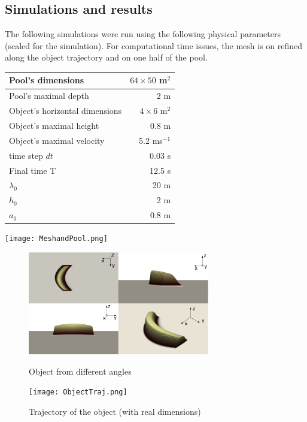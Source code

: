 \documentclass[11pt,a4paper]{article}
\begin{document}
\subsection{Simulations and results}\label{Results}
	The following simulations were run using the following physical parameters (scaled for the simulation). For computational time issues, the mesh is on refined along the object trajectory and on one half of the pool.\\
	\begin{minipage}[t]{0.5\linewidth}
		\vspace{0pt}
		\begin{tabular}{|l|r|}
			\hline
			Pool's dimensions & $64\times50$ m$^2$	\\
			\hline
			Pool's maximal depth & $2$ m \\
			\hline
			Object's horizontal dimensions & $4\times6$ m$^2$\\
			\hline
			Object's maximal height & 0.8 m\\
			\hline
			Object's maximal velocity & 5.2 ms$^{-1}$\\
			\hline
			time step $dt$ & 0.03 s \\
			\hline		
			Final time T & 12.5 s\\
			\hline
			$\lambda_0$ & 20 m \\
			\hline
			$h_0$ & 2 m\\
			\hline
			$a_0$ & 0.8 m\\
			\hline
		\end{tabular}
	\end{minipage}
	\hfill
	\begin{minipage}[t]{0.5\linewidth}
		\vspace{0pt}
		\centering
		\texttt{[image: MeshandPool.png]}
	\end{minipage}
	\linebreak
	\begin{figure}[!h]
		\begin{minipage}[t]{0.5\linewidth}
			\centering
			\includegraphics[height=4.5cm]{ObjectUsedModified.png}
			\caption{Object from different angles}
		\end{minipage}
		\hspace{10pt}
		\begin{minipage}[t]{0.5\linewidth}
			\centering
			\texttt{[image: ObjectTraj.png]}
			\caption{Trajectory of the object (with real dimensions)}
		\end{minipage}
	\end{figure}
\end{document}
